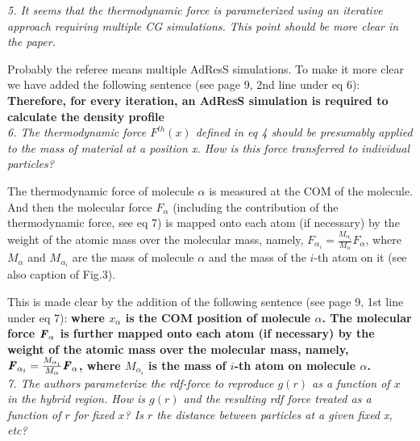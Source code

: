 \documentclass[a4paper]{article}
\renewcommand{\v}[1]{\textbf{\textit{#1}}}
\begin{document}
\textit{
5. It seems that the thermodynamic force is parameterized using an
iterative approach requiring multiple CG simulations. This point
should be more clear in the paper.
}

Probably the referee means multiple AdResS simulations. To make it more clear we have added the following sentence (see page 9, 2nd line under eq 6): {\bf Therefore, for every iteration, an AdResS simulation is required to calculate the density profile}
\\

\textit{
6. The thermodynamic force $F^{th}(x)$ defined in eq 4 should be
presumably applied to the mass of material at a position x. How is
this force transferred to individual particles?
}

The thermodynamic force of molecule $\alpha$ is measured at the COM of
the molecule.  And then the molecular force ${F}_{\alpha}$ (including
the contribution of the thermodynamic force, see eq 7) is 
mapped onto each atom (if necessary) by the weight of the atomic mass
over the molecular mass, namely, $F_{\alpha_i} =
\frac{M_{\alpha_i}}{M_\alpha}F_{\alpha}$, where $M_{\alpha}$ and
$M_{\alpha_i}$ are the mass of molecule $\alpha$ and the mass of the
$i$-th atom on it (see also caption of Fig.3).

This is made clear by the addition of the following sentence (see page 9, 1st line under eq 7): {\bf 
  where $x_\alpha$ is the COM position of molecule $\alpha$.
  The molecular force ${\v F}_{\alpha}$ 
  is further mapped onto each atom (if necessary) by the weight
of the atomic mass over the molecular mass, namely,
$\v F_{\alpha_i} = \frac{M_{\alpha_i}}{M_\alpha}\v F_{\alpha}$, where
$M_{\alpha_i}$ is the mass of $i$-th atom on molecule $\alpha$.}
\\

\textit{
7. The authors parameterize the rdf-force to reproduce $g(r)$ as a
function of $x$ in the hybrid region. How is $g(r)$ and the resulting rdf
force treated as a function of $r$ for fixed $x$? Is $r$ the distance
between particles at a given fixed x, etc?
}
\end{document}
